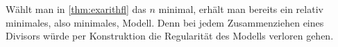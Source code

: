 \begin{Bemerkung}\label{bem:konstruktionminmodell}
  Wählt man in \ref{thm:exarithfl} das $n$ minimal, erhält man bereits
  ein relativ minimales, also minimales, Modell. Denn
  bei jedem Zusammenziehen eines Divisors würde per Konstruktion die
  Regularität des Modells verloren gehen.
\end{Bemerkung}

